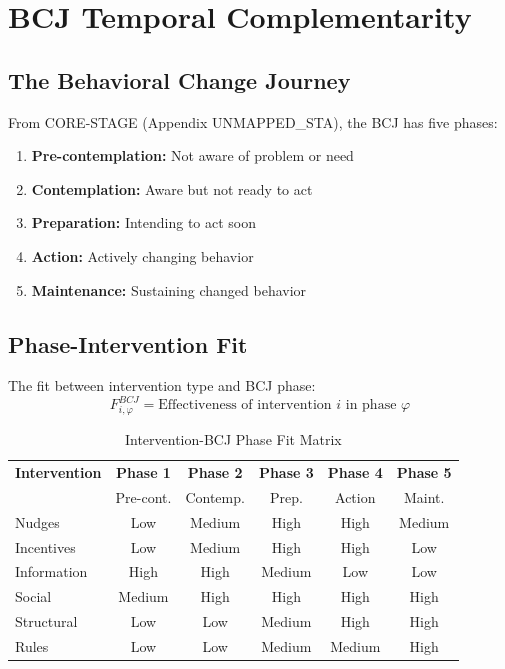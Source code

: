 \section{BCJ Temporal Complementarity}
\label{sec:bcj}

\subsection{The Behavioral Change Journey}

From CORE-STAGE (Appendix UNMAPPED_STA), the BCJ has five phases:
\begin{enumerate}[noitemsep]
    \item \textbf{Pre-contemplation:} Not aware of problem or need
    \item \textbf{Contemplation:} Aware but not ready to act
    \item \textbf{Preparation:} Intending to act soon
    \item \textbf{Action:} Actively changing behavior
    \item \textbf{Maintenance:} Sustaining changed behavior
\end{enumerate}

\subsection{Phase-Intervention Fit}

\begin{definition}
The fit between intervention type and BCJ phase:
\begin{equation}
F^{BCJ}_{i,\varphi} = \text{Effectiveness of intervention } i \text{ in phase } \varphi
\end{equation}
\end{definition}

\begin{table}[h]
\centering
\caption{Intervention-BCJ Phase Fit Matrix}
\label{tab:bcj-fit}
\renewcommand{\arraystretch}{1.3}
\small
\begin{tabular}{@{}lccccc@{}}
\toprule
\textbf{Intervention} & \textbf{Phase 1} & \textbf{Phase 2} & \textbf{Phase 3} & \textbf{Phase 4} & \textbf{Phase 5} \\
 & Pre-cont. & Contemp. & Prep. & Action & Maint. \\
\midrule
Nudges & Low & Medium & High & High & Medium \\
Incentives & Low & Medium & High & High & Low \\
Information & High & High & Medium & Low & Low \\
Social & Medium & High & High & High & High \\
Structural & Low & Low & Medium & High & High \\
Rules & Low & Low & Medium & Medium & High \\
\bottomrule
\end{tabular}
\end{table}

